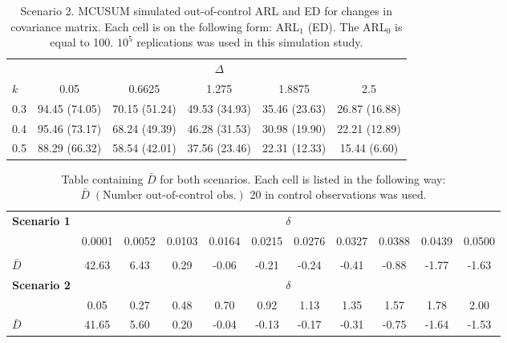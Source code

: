 \documentclass[a4paper,11pt,fleqn,twoside,notitlepage]{report}
\begin{document}
\begin{table}[ht]
\centering
\caption{Scenario 2. MCUSUM simulated out-of-control ARL and ED for changes in covariance matrix. Each cell is on the following form: ARL$_1$ (ED). The ARL$_0$ is equal to 100. $10^5$ replications was used in this simulation study.\label{LongTable2}}
\begin{tabular}{lccccc}
\toprule
& \multicolumn{5}{c}{$\Delta$} \\ \cmidrule(r){2-6}
$k$ & 0.05 & 0.6625 & 1.275 & 1.8875 & 2.5 \\[0.1cm] 
\midrule
\rowcolor[gray]{.9} 0.3 & 94.45 (74.05) & 70.15 (51.24) & 49.53 (34.93) & 35.46 (23.63) & 26.87 (16.88) \\[0.2cm]
\midrule
\rowcolor[gray]{.85}  0.4 & 95.46 (73.17) & 68.24 (49.39) & 46.28 (31.53) & 30.98 (19.90) & 22.21 (12.89) \\[0.2cm] 
\midrule
\rowcolor[gray]{.9}  0.5 & 88.29 (66.32) & 58.54 (42.01) & 37.56 (23.46) & 22.31 (12.33) & 15.44 (6.60) \\[0.2cm] 
\bottomrule
\end{tabular}
\end{table}

\begin{table}[ht]
\centering
\caption{Table containing $\bar{D}$ for both scenarios. Each cell is listed in the following way: $\bar{D}\; (\text{Number out-of-control obs.})$ 20 in control observations was used.\label{OffsetTable}}
\begin{tabular}{lcccccccccc}
\toprule
\textbf{Scenario 1} & \multicolumn{10}{c}{$\delta$} \\ \cmidrule(r){2-11} 
 & 0.0001 & 0.0052 & 0.0103 & 0.0164 & 0.0215 & 0.0276 & 0.0327 & 0.0388 & 0.0439 & 0.0500 \\  \\[0.1cm]
\rowcolor[gray]{.9}  $\bar{D}$ & 42.63 & 6.43 & 0.29 & -0.06 & -0.21 & -0.24 & -0.41 & -0.88 & -1.77 & -1.63 \\[0.1cm]
\midrule
\textbf{Scenario 2} & \multicolumn{10}{c}{$\delta$} \\ \cmidrule(r){2-11} 
 & 0.05 & 0.27 & 0.48 & 0.70 & 0.92 & 1.13 & 1.35 & 1.57 & 1.78 & 2.00 \\[0.1cm] 
\rowcolor[gray]{.85}  $\bar{D}$ & 41.65 & 5.60 & 0.20 & -0.04 & -0.13 & -0.17 & -0.31 & -0.75 & -1.64 & -1.53 \\
\bottomrule
\end{tabular}
\end{table}

\end{document}
